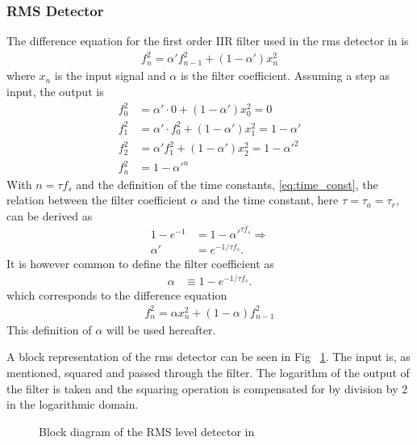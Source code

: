 \documentclass[../main2.tex]{subfiles}
\providecommand{\rootdir}{..}
\begin{document}
\subsubsection{RMS Detector}
The difference equation for the first order IIR filter used in the rms detector in \cite{mcnally1984dynamic} is
\begin{align*}
f_n^2 = \alpha' f_{n-1}^2+ (1-\alpha') x_n^2
\end{align*}
where $x_n$ is the input signal and $\alpha$ is the filter coefficient. Assuming a step as input, the output is
\begin{align*}
f_0^2 &= \alpha' \cdot 0 + (1-\alpha')x_0^2 = 0 \\
f_1^2 &= \alpha' \cdot f_0^2 + (1-\alpha')x_1^2 = 1-\alpha'\\
f_2^2 &= \alpha' f_1^2+ (1-\alpha')x_2^2 = 1-\alpha'^2 \\
f_n^2 &= 1-\alpha'^{n}
\end{align*}
With $n = \tau f_s$ and the definition of the time constants, \eqref{eq:time_const}, the relation between the filter coefficient $\alpha$ and the time constant, here $\tau = \tau_a = \tau_r$, can be derived as
\begin{align*}
1-e^{-1} &= 1-\alpha'^{\tau f_s} \Longrightarrow \\
\alpha' &= e^{-1/\tau f_s}.
\end{align*}
It is however common to define the filter coefficient as
\begin{align}
\alpha &\equiv 1-e^{-1/\tau f_s}.
\end{align}
which corresponds to the difference equation
\begin{align}
f_n^2 = \alpha x_n^2 + (1-\alpha) f_{n-1}^2
\end{align}
This definition of $\alpha$ will be used hereafter.

A block representation of the rms detector can be seen in Fig ~\ref{fig:block_mcnally_theory_rms}. The input is, as mentioned, squared and passed through the filter. The logarithm of the output of the filter is taken and the squaring operation is compensated for by division by 2 in the logarithmic domain.
\begin{figure}
\centerline{}
\caption{Block diagram of the RMS level detector in \cite{mcnally1984dynamic}}
\label{fig:block_mcnally_theory_rms}
\end{figure}
\end{document}
